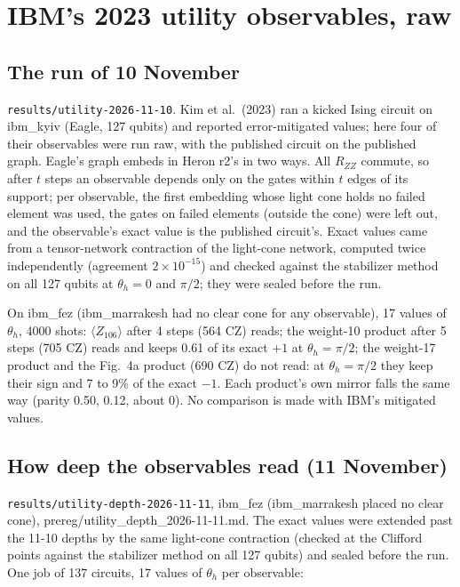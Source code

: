 \documentclass[10pt,a4paper]{article}
\begin{document}
\section{IBM's 2023 utility observables, raw}\label{sec:utility}
\subsection{The run of 10 November}
\texttt{results/utility-2026-11-10}. Kim et al.\ (2023) ran a kicked Ising circuit on ibm\_kyiv (Eagle, 127 qubits)
and reported error-mitigated values; here four of their observables were run raw, with the published circuit on the
published graph. Eagle's graph embeds in Heron r2's in two ways. All $R_{ZZ}$ commute, so after $t$ steps an
observable depends only on the gates within $t$ edges of its support; per observable, the first embedding whose light
cone holds no failed element was used, the gates on failed elements (outside the cone) were left out, and the
observable's exact value is the published circuit's. Exact values came from a tensor-network contraction of the
light-cone network, computed twice independently (agreement $2\times10^{-15}$) and checked against the stabilizer
method on all 127 qubits at $\theta_h = 0$ and $\pi/2$; they were sealed before the run.

On ibm\_fez (ibm\_marrakesh had no clear cone for any observable), 17 values of $\theta_h$, 4000 shots:
$\langle Z_{106}\rangle$ after 4 steps (564 CZ) reads; the weight-10 product after 5 steps (705 CZ) reads and keeps 0.61
of its exact $+1$ at $\theta_h = \pi/2$; the weight-17 product and the Fig.~4a product (690 CZ) do not read: at
$\theta_h = \pi/2$ they keep their sign and 7 to 9\% of the exact $-1$. Each product's own mirror falls the same way
(parity 0.50, 0.12, about 0). No comparison is made with IBM's mitigated values.

\subsection{How deep the observables read (11 November)}\label{sec:utility-depth}
\texttt{results/utility-depth-2026-11-11}, ibm\_fez (ibm\_marrakesh placed no clear cone),
prereg/utility\_depth\_2026-11-11.md. The exact values were extended past the 11-10 depths by the same light-cone
contraction (checked at the Clifford points against the stabilizer method on all 127 qubits) and sealed before the
run. One job of 137 circuits, 17 values of $\theta_h$ per observable:
\end{document}

